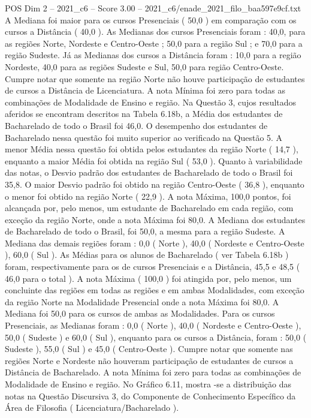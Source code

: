 \begin{textsample}{POS Dim 2 – 2021\_c6 – Score 3.00 – 2021\_c6/enade\_2021\_filo\_baa597e9cf.txt}
A Mediana foi maior para os cursos Presenciais ( 50,0 ) em comparação com os cursos a Distância ( 40,0 ).
As Medianas dos cursos Presenciais foram : 40,0, para as regiões Norte, Nordeste e Centro-Oeste ; 50,0 para a região Sul ; e 70,0 para a região Sudeste.
Já as Medianas dos cursos a Distância foram : 10,0 para a região Nordeste, 40,0 para as regiões Sudeste e Sul, 50,0 para região Centro-Oeste.
Cumpre notar que somente na região Norte não houve participação de estudantes de cursos a Distância de Licenciatura.
A nota Mínima foi zero para todas as combinações de Modalidade de Ensino e região.
Na Questão 3, cujos resultados aferidos se encontram descritos na Tabela 6.18b, a Média dos estudantes de Bacharelado de todo o Brasil foi 46,0.
O desempenho dos estudantes de Bacharelado nessa questão foi muito superior ao verificado na Questão 5.
A menor Média nessa questão foi obtida pelos estudantes da região Norte ( 14,7 ), enquanto a maior Média foi obtida na região Sul ( 53,0 ).
Quanto à variabilidade das notas, o Desvio padrão dos estudantes de Bacharelado de todo o Brasil foi 35,8.
O maior Desvio padrão foi obtido na região Centro-Oeste ( 36,8 ), enquanto o menor foi obtido na região Norte ( 22,9 ).
A nota Máxima, 100,0 pontos, foi alcançada por, pelo menos, um estudante de Bacharelado em cada região, com exceção da região Norte, onde a nota Máxima foi 80,0.
A Mediana dos estudantes de Bacharelado de todo o Brasil, foi 50,0, a mesma para a região Sudeste.
A Mediana das demais regiões foram : 0,0 ( Norte ), 40,0 ( Nordeste e Centro-Oeste ), 60,0 ( Sul ).
As Médias para os alunos de Bacharelado ( ver Tabela 6.18b ) foram, respectivamente para os de cursos Presenciais e a Distância, 45,5 e 48,5 ( 46,0 para o total ).
A nota Máxima ( 100,0 ) foi atingida por, pelo menos, um concluinte das regiões em todas as regiões e em ambas Modalidades, com exceção da região Norte na Modalidade Presencial onde a nota Máxima foi 80,0.
A Mediana foi 50,0 para os cursos de ambas as Modalidades.
Para os cursos Presenciais, as Medianas foram : 0,0 ( Norte ), 40,0 ( Nordeste e Centro-Oeste ), 50,0 ( Sudeste ) e 60,0 ( Sul ), enquanto para os cursos a Distância, foram : 50,0 ( Sudeste ), 55,0 ( Sul ) e 45,0 ( Centro-Oeste ).
Cumpre notar que somente nas regiões Norte e Nordeste não houveram participação de estudantes de cursos a Distância de Bacharelado.
A nota Mínima foi zero para todas as combinações de Modalidade de Ensino e região.
No Gráfico 6.11, mostra -se a distribuição das notas na Questão Discursiva 3, do Componente de Conhecimento Específico da Área de Filosofia ( Licenciatura/Bacharelado ).

\end{textsample}
